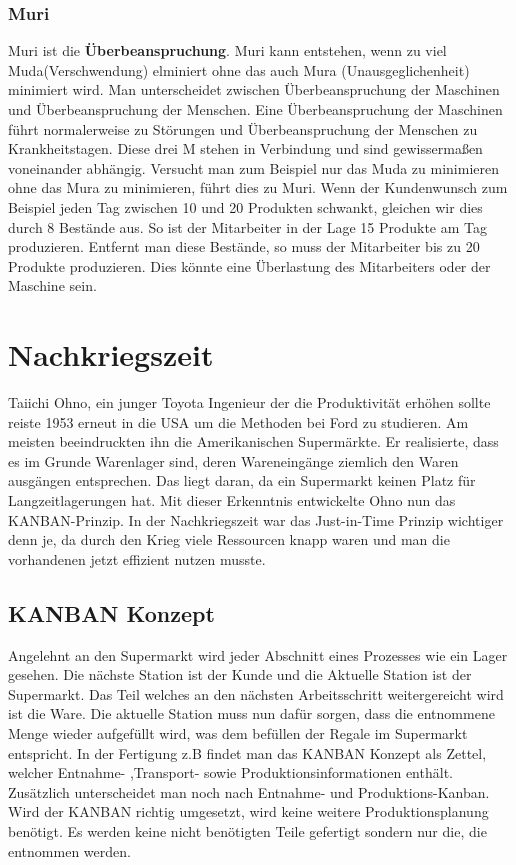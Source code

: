 \documentclass[00_ToyotaProduktionssystem.tex]{subfiles}
\begin{document}
\subsubsection{Muri}
Muri ist die \textbf{Überbeanspruchung}. Muri kann entstehen, wenn zu viel Muda(Verschwendung) elminiert ohne das auch Mura (Unausgeglichenheit) minimiert wird. Man unterscheidet zwischen Überbeanspruchung der Maschinen und Überbeanspruchung der Menschen. Eine Überbeanspruchung der Maschinen führt normalerweise zu Störungen und Überbeanspruchung der Menschen zu Krankheitstagen. 
\newline Diese drei M stehen in Verbindung und sind gewissermaßen voneinander abhängig. Versucht man zum Beispiel nur das Muda zu minimieren ohne das Mura zu minimieren, führt dies zu Muri. Wenn der Kundenwunsch zum Beispiel jeden Tag zwischen 10 und 20 Produkten schwankt, gleichen wir dies durch 8 Bestände aus. So ist der Mitarbeiter in der Lage 15 Produkte am Tag produzieren. Entfernt man diese Bestände, so muss der Mitarbeiter bis zu 20 Produkte produzieren. Dies könnte eine Überlastung des Mitarbeiters oder der Maschine sein.


\section{Nachkriegszeit}
Taiichi Ohno, ein junger Toyota Ingenieur der die Produktivität erhöhen sollte reiste 1953 erneut in die USA um die Methoden bei Ford zu studieren. Am meisten beeindruckten ihn die Amerikanischen Supermärkte. Er realisierte, dass es im Grunde Warenlager sind, deren Wareneingänge ziemlich den Waren ausgängen entsprechen. Das liegt daran, da ein Supermarkt keinen Platz für Langzeitlagerungen hat. Mit dieser Erkenntnis entwickelte Ohno nun das KANBAN-Prinzip. In der Nachkriegszeit war das Just-in-Time Prinzip wichtiger denn je, da durch den Krieg viele Ressourcen knapp waren und man die vorhandenen jetzt effizient nutzen musste.
\subsection{KANBAN Konzept}
Angelehnt an den Supermarkt wird jeder Abschnitt eines Prozesses wie ein Lager gesehen. Die nächste Station ist der Kunde und die Aktuelle Station ist der Supermarkt. Das Teil welches an den nächsten Arbeitsschritt weitergereicht wird ist die Ware. Die aktuelle Station muss nun dafür sorgen, dass die entnommene Menge wieder aufgefüllt wird, was dem befüllen der Regale im Supermarkt entspricht.
In der Fertigung z.B findet man das KANBAN Konzept als Zettel, welcher Entnahme- ,Transport- sowie Produktionsinformationen enthält.
Zusätzlich unterscheidet man noch nach Entnahme- und Produktions-Kanban.
Wird der KANBAN richtig umgesetzt, wird keine weitere Produktionsplanung benötigt. Es werden keine nicht benötigten Teile gefertigt sondern nur die, die entnommen werden.
\end{document}
